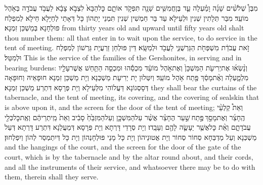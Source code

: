 {מִבֶּן֩ שְׁלֹשִׁ֨ים שָׁנָ֜ה וָמַ֗עְלָה עַ֛ד בֶּן\maqqaf חֲמִשִּׁ֥ים שָׁנָ֖ה תִּפְקֹ֣ד אוֹתָ֑ם כׇּל\maqqaf הַבָּא֙ לִצְבֹ֣א צָבָ֔א לַעֲבֹ֥ד עֲבֹדָ֖ה בְּאֹ֥הֶל מוֹעֵֽד׃}
{מִבַּר תְּלָתִין שְׁנִין וּלְעֵילָא עַד בַּר חַמְשִׁין שְׁנִין תִּמְנֵי יָתְהוֹן כָּל דְּאָתֵי לְחַיָּלָא חֵילָא לְמִפְלַח פּוּלְחָנָא בְּמַשְׁכַּן זִמְנָא׃}
{from thirty years old and upward until fifty years old shalt thou number them: all that enter in to wait upon the service, to do service in the tent of meeting.}{}
{זֹ֣את עֲבֹדַ֔ת מִשְׁפְּחֹ֖ת הַגֵּרְשֻׁנִּ֑י לַעֲבֹ֖ד וּלְמַשָּֽׂא׃}
{דֵּין פּוּלְחַן זַרְעֲיָת גֵּרְשׁוֹן לְמִפְלַח וּלְמִטַּל׃}
{This is the service of the families of the Gershonites, in serving and in bearing burdens:}{}
{וְנָ֨שְׂא֜וּ אֶת\maqqaf יְרִיעֹ֤ת הַמִּשְׁכָּן֙ וְאֶת\maqqaf אֹ֣הֶל מוֹעֵ֔ד מִכְסֵ֕הוּ וּמִכְסֵ֛ה הַתַּ֥חַשׁ אֲשֶׁר\maqqaf עָלָ֖יו מִלְמָ֑עְלָה וְאֶ֨ת\maqqaf מָסַ֔ךְ פֶּ֖תַח אֹ֥הֶל מוֹעֵֽד׃}
{וְיִטְּלוּן יָת יְרִיעָת מַשְׁכְּנָא וְיָת מַשְׁכַּן זִמְנָא חוּפָאֵיהּ וְחוּפָאָה דְּסָסְגוֹנָא דַּעֲלוֹהִי מִלְּעֵילָא וְיָת פְּרָסָא דִּתְרַע מַשְׁכַּן זִמְנָא׃}
{they shall bear the curtains of the tabernacle, and the tent of meeting, its covering, and the covering of sealskin that is above upon it, and the screen for the door of the tent of meeting;}{}
{וְאֵת֩ קַלְעֵ֨י הֶֽחָצֵ֜ר וְאֶת\maqqaf מָסַ֣ךְ \legarmeh  פֶּ֣תַח \legarmeh  שַׁ֣עַר הֶחָצֵ֗ר אֲשֶׁ֨ר עַל\maqqaf הַמִּשְׁכָּ֤ן וְעַל\maqqaf הַמִּזְבֵּ֙חַ֙ סָבִ֔יב וְאֵת֙ מֵֽיתְרֵיהֶ֔ם וְאֶֽת\maqqaf כׇּל\maqqaf כְּלֵ֖י עֲבֹדָתָ֑ם וְאֵ֨ת כׇּל\maqqaf אֲשֶׁ֧ר יֵעָשֶׂ֛ה לָהֶ֖ם וְעָבָֽדוּ׃}
{וְיָת סְרָדֵי דָּרְתָא וְיָת פְּרָסָא דְּמַעֲלַנָא דִּתְרַע דָּרְתָא דְּעַל מַשְׁכְּנָא וְעַל מַדְבְּחָא סְחוֹר סְחוֹר וְיָת אֲטוּנֵיהוֹן וְיָת כָּל מָנֵי פּוּלְחָנְהוֹן וְיָת כָּל דְּיִתְמְסַר לְהוֹן וְיִפְלְחוּן׃}
{and the hangings of the court, and the screen for the door of the gate of the court, which is by the tabernacle and by the altar round about, and their cords, and all the instruments of their service, and whatsoever there may be to do with them, therein shall they serve.}{}
